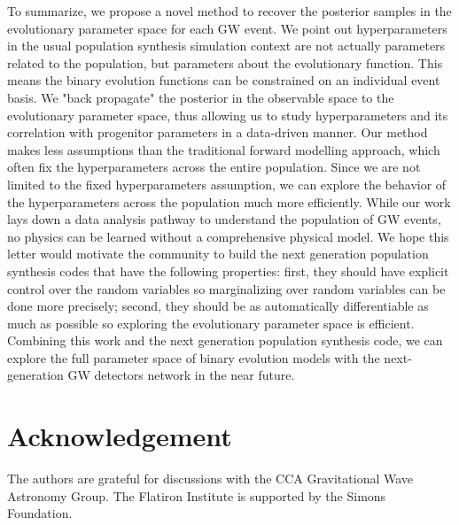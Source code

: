 \documentclass[twocolumn]{aastex631}
\begin{document}
To summarize, we propose a novel method to recover the posterior samples in the evolutionary parameter space for each GW event.
We point out hyperparameters in the usual population synthesis simulation context are not actually parameters related to the population,
but parameters about the evolutionary function.
This means the binary evolution functions can be constrained on an individual event basis.
We "back propagate" the posterior in the observable space to the evolutionary parameter space,
thus allowing us to study hyperparameters and its correlation with progenitor parameters in a data-driven manner.
Our method makes less assumptions than the traditional forward modelling approach,
which often fix the hyperparameters across the entire population.
Since we are not limited to the fixed hyperparameters assumption, we can explore the behavior of the hyperparameters across the population much more efficiently.
While our work lays down a data analysis pathway to understand the population of GW events,
no physics can be learned without a comprehensive physical model.
We hope this letter would motivate the community to build the next generation population synthesis codes that have the following properties:
first, they should have explicit control over the random variables so marginalizing over random variables can be done more precisely;
second, they should be as automatically differentiable as much as possible so exploring the evolutionary parameter space is efficient.
Combining this work and the next generation population synthesis code,
we can explore the full parameter space of binary evolution models with the next-generation GW detectors network in the near future.


\section{Acknowledgement}
The authors are grateful for discussions with the CCA Gravitational Wave Astronomy Group.
The Flatiron Institute is supported by the Simons Foundation.



\end{document}
